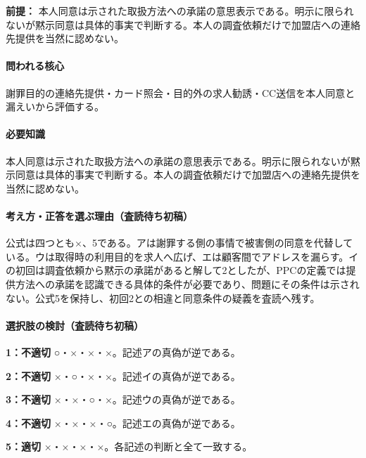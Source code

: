 \noindent\textbf{前提：} 本人同意は示された取扱方法への承諾の意思表示である。明示に限られないが黙示同意は具体的事実で判断する。本人の調査依頼だけで加盟店への連絡先提供を当然に認めない。\par

\paragraph{問われる核心} 謝罪目的の連絡先提供・カード照会・目的外の求人勧誘・CC送信を本人同意と漏えいから評価する。

\paragraph{必要知識} 本人同意は示された取扱方法への承諾の意思表示である。明示に限られないが黙示同意は具体的事実で判断する。本人の調査依頼だけで加盟店への連絡先提供を当然に認めない。

\paragraph{考え方・正答を選ぶ理由（査読待ち初稿）} 公式は四つとも×、5である。アは謝罪する側の事情で被害側の同意を代替している。ウは取得時の利用目的を求人へ広げ、エは顧客間でアドレスを漏らす。イの初回は調査依頼から黙示の承諾があると解して2としたが、PPCの定義では提供方法への承諾を認識できる具体的条件が必要であり、問題にその条件は示されない。公式5を保持し、初回2との相違と同意条件の疑義を査読へ残す。

\paragraph{選択肢の検討（査読待ち初稿）}\mbox{}\par

\noindent\textbf{1：不適切} ○・×・×・×。記述アの真偽が逆である。\par

\noindent\textbf{2：不適切} ×・○・×・×。記述イの真偽が逆である。\par

\noindent\textbf{3：不適切} ×・×・○・×。記述ウの真偽が逆である。\par

\noindent\textbf{4：不適切} ×・×・×・○。記述エの真偽が逆である。\par

\noindent\textbf{5：適切} ×・×・×・×。各記述の判断と全て一致する。\par

